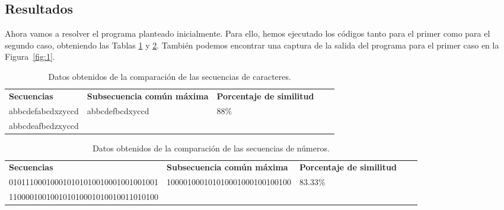 \subsection{Resultados}

Ahora vamos a resolver el programa planteado inicialmente. Para ello,
hemos ejecutado los códigos tanto para el primer como para el segundo caso,
obteniendo las Tablas \ref{tab:s1} y \ref{tab:s2}. También podemos encontrar
una captura de la salida del programa para el primer caso en la Figura~\ref{fig:1}. 

\begin{table}[h]
    \footnotesize
    \centering
	\begin{tabular}{|l|l|l|ll}
		\cline{1-3}
		\textbf{Secuencias}                           & \textbf{Subsecuencia común máxima}                       & \textbf{Porcentaje de similitud}     &  &  \\ \cline{1-3}
		abbcdefabcdxzyccd                    & \multirow{2}{*}{abbcdefbcdxyccd}                & \multirow{2}{*}{$88 \%$}    &  &  \\ \cline{1-1}
		abbcdeafbcdzxyccd                    &                                                 &                             &  &  \\ \cline{1-3}
	\end{tabular}
  \caption{Datos obtenidos de la comparación de las secuencias de caracteres.}
  \label{tab:s1}
\end{table}

\begin{table}[h]
  \footnotesize
  \centering
\begin{tabular}{|l|l|l|ll}
  \cline{1-3}
  \textbf{Secuencias}                           & \textbf{Subsecuencia común máxima}                       & \textbf{Porcentaje de similitud}     &  &  \\ \cline{1-3}
  010111000100010101010010001001001001 & \multirow{2}{*}{100001000101010001000100100100} & \multirow{2}{*}{$83.33 \%$} &  &  \\ \cline{1-1}
  110000100100101010001010010011010100 &                                                 &                             &  &  \\ \cline{1-3}
\end{tabular}
\caption{Datos obtenidos de la comparación de las secuencias de números.}
\label{tab:s2}
\end{table}

